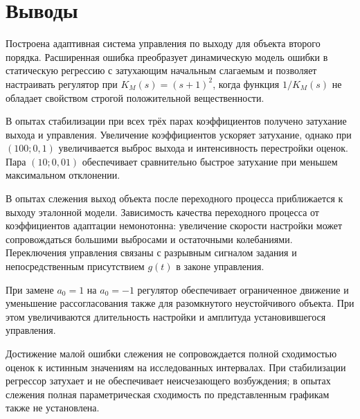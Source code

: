 \section{Выводы}

Построена адаптивная система управления по выходу для объекта
второго порядка. Расширенная ошибка преобразует динамическую
модель ошибки в статическую регрессию с затухающим начальным
слагаемым и позволяет настраивать регулятор при
$K_M(s)=(s+1)^2$, когда функция $1/K_M(s)$
не обладает свойством строгой положительной вещественности.

В опытах стабилизации при всех трёх парах коэффициентов
получено затухание выхода и управления.
Увеличение коэффициентов ускоряет затухание,
однако при $(100;0{,}1)$ увеличивается выброс выхода
и интенсивность перестройки оценок.
Пара $(10;0{,}01)$ обеспечивает сравнительно быстрое затухание
при меньшем максимальном отклонении.

В опытах слежения выход объекта после переходного процесса
приближается к выходу эталонной модели.
Зависимость качества переходного процесса от коэффициентов
адаптации немонотонна: увеличение скорости настройки
может сопровождаться большими выбросами и остаточными колебаниями.
Переключения управления связаны с разрывным сигналом задания
и непосредственным присутствием $g(t)$ в законе управления.

При замене $a_0=1$ на $a_0=-1$ регулятор обеспечивает
ограниченное движение и уменьшение рассогласования
также для разомкнутого неустойчивого объекта.
При этом увеличиваются длительность настройки
и амплитуда установившегося управления.

Достижение малой ошибки слежения не сопровождается
полной сходимостью оценок к истинным значениям
на исследованных интервалах.
При стабилизации регрессор затухает и не обеспечивает
неисчезающего возбуждения; в опытах слежения
полная параметрическая сходимость по представленным графикам
также не установлена.